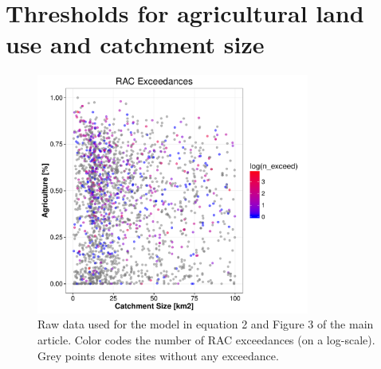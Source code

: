 \documentclass[pdftex,a4paper]{scrreprt}
\begin{document}





\chapter{Thresholds for agricultural land use and catchment size}
\begin{figure}[h]
	\centering
	\includegraphics[width = 0.8\textwidth]{ezgagrirac}
	\caption[Raw data used for the model in equation 2 and Figure 3 of the main article.]{Raw data used for the model in equation 2 and Figure 3 of the main article. Color codes the number of RAC exceedances (on a log-scale). Grey points denote sites without any exceedance.}
	\label{fig:ezgagrirac}
\end{figure}



\end{document}
